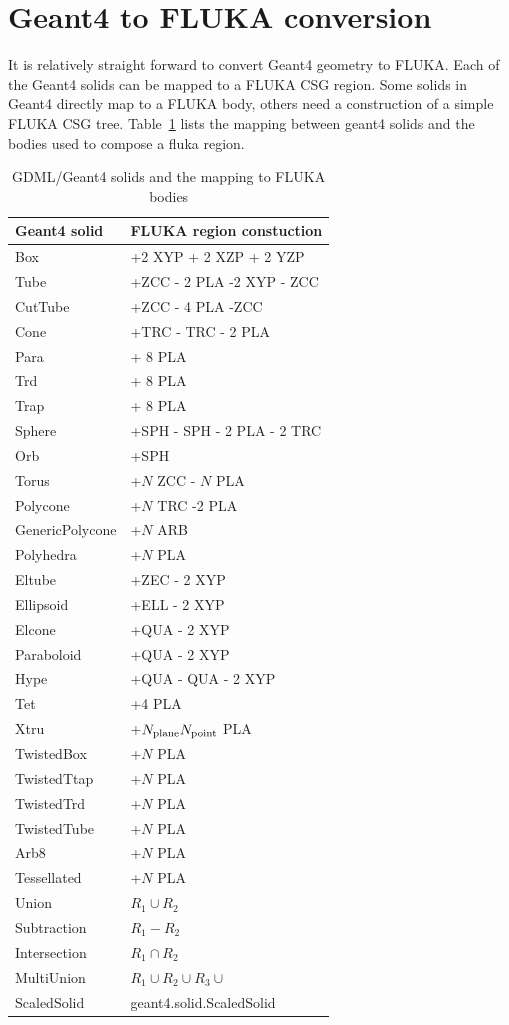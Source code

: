 \documentclass[final,5p,times,twocolumn]{elsarticle}
\begin{document}
\section{Geant4 to FLUKA conversion}
It is relatively straight forward to convert Geant4 geometry to FLUKA. Each of the Geant4 solids can be mapped to a FLUKA CSG region.
Some solids in Geant4 directly map to a FLUKA body, others need a construction of a simple FLUKA CSG tree. Table~\ref{tab:geant2fluka}
lists the mapping between geant4 solids and the bodies used to compose a fluka region.


\begin{table}[hbt!]
\centering
\begin{tabular}{| l | l | } \hline
Geant4 solid			& FLUKA region constuction		\\ \hline
Box					& +2 XYP + 2 XZP + 2 YZP 		\\
Tube					& +ZCC - 2 PLA -2 XYP - ZCC	 	\\
CutTube				& +ZCC - 4 PLA -ZCC			\\
Cone				& +TRC - TRC - 2 PLA 			\\
Para					& + 8 PLA						\\
Trd					& + 8 PLA						\\
Trap					& + 8 PLA						\\
Sphere				& +SPH - SPH  - 2 PLA - 2 TRC	\\
Orb					& +SPH						\\
Torus				& +$N$ ZCC  - $N$ PLA			\\
Polycone				& +$N$ TRC -2 PLA				\\
GenericPolycone		& +$N$ ARB					\\
Polyhedra				& +$N$ PLA					\\
Eltube				& +ZEC  - 2 XYP				\\
Ellipsoid				& +ELL - 2 XYP		 			\\
Elcone				& +QUA - 2 XYP				\\
Paraboloid			& +QUA - 2 XYP				\\
Hype					& +QUA - QUA - 2 XYP			\\
Tet					& +4 PLA						\\
Xtru					& +$N_{\rm plane} N_{\rm point}$ PLA \\
TwistedBox			& +$N$ PLA					\\
TwistedTtap			& +$N$ PLA					\\
TwistedTrd			& +$N$ PLA				 	\\
TwistedTube			& +$N$ PLA					\\
Arb8					& +$N$ PLA					\\
Tessellated			& +$N$ PLA				 	\\
Union				& $R_1 \cup R_2$				\\
Subtraction			& $R_1 - R_2$					\\
Intersection			& $R_1 \cap R_2$				\\
MultiUnion			& $R_1 \cup R_2 \cup R_3 \cup$	\\
ScaledSolid			& geant4.solid.ScaledSolid		\\ \hline				
\end{tabular}
\label{tab:geant2fluka}
\caption{GDML/Geant4 solids and the mapping to FLUKA bodies}
\end{table}
\end{document}
